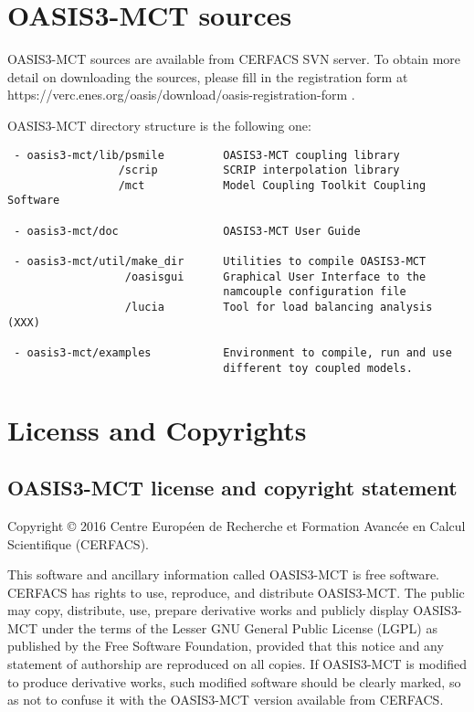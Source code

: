 \section{OASIS3-MCT sources}
\label{sec_Obtaining}
OASIS3-MCT sources are available from CERFACS SVN server. To obtain more detail on downloading
the sources, please fill in the registration form at
https://verc.enes.org/oasis/download/oasis-registration-form .

OASIS3-MCT directory structure is the following one:

\begin{verbatim}
 - oasis3-mct/lib/psmile         OASIS3-MCT coupling library
                 /scrip          SCRIP interpolation library
                 /mct            Model Coupling Toolkit Coupling Software
                  
 - oasis3-mct/doc                OASIS3-MCT User Guide

 - oasis3-mct/util/make_dir      Utilities to compile OASIS3-MCT
                  /oasisgui      Graphical User Interface to the
                                 namcouple configuration file
                  /lucia         Tool for load balancing analysis (XXX)

 - oasis3-mct/examples           Environment to compile, run and use
                                 different toy coupled models. 
\end{verbatim}
\newpage
\section{Licenss and Copyrights}
 
\subsection{OASIS3-MCT license and copyright statement}

Copyright © 2016 Centre Europ\'een de Recherche et Formation
Avanc\'ee en Calcul Scientifique (CERFACS).  

This software and ancillary information called OASIS3-MCT is free
software.  CERFACS has rights to use, reproduce, and distribute
OASIS3-MCT. The public may copy, distribute, use, prepare derivative works and
publicly display OASIS3-MCT under the terms of the Lesser GNU General
Public License (LGPL) as published by the Free Software Foundation,
provided that this notice and any statement of authorship are
reproduced on all copies. If OASIS3-MCT is modified to produce derivative
works, such modified software should be clearly marked, so as not to
confuse it with the OASIS3-MCT version available from CERFACS.

